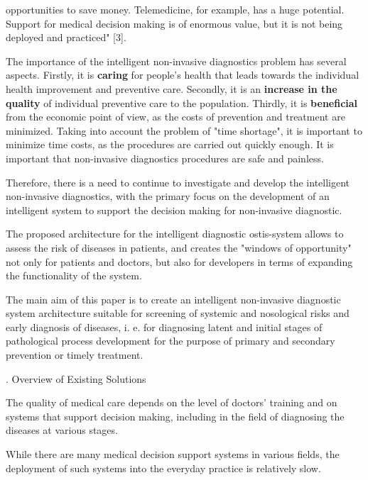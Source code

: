 \documentclass[a4paper]{article}
\newcommand{\RomanNumeralCaps}[1]
    {\MakeUppercase{\romannumeral #1}}
\begin{document}
\begin{multicols}{2}
opportunities to save money. Telemedicine, for example,
has a huge potential. Support for medical decision
making is of enormous value, but it is not being deployed
and practiced" [3].
\par The importance of the intelligent non-invasive diagnostics problem has several aspects. Firstly, it is \textbf{caring}
for people’s health that leads towards the individual
health improvement and preventive care. Secondly, it
is an \textbf{increase in the quality} of individual preventive
care to the population. Thirdly, it is \textbf{beneficial} from
the economic point of view, as the costs of prevention
and treatment are minimized. Taking into account the
problem of "time shortage", it is important to minimize
time costs, as the procedures are carried out quickly
enough. It is important that non-invasive diagnostics
procedures are safe and painless.
\par Therefore, there is a need to continue to investigate
and develop the intelligent non-invasive diagnostics, with
the primary focus on the development of an intelligent
system to support the decision making for non-invasive
diagnostic.
\par The proposed architecture for the intelligent diagnostic
ostis-system allows to assess the risk of diseases in
patients, and creates the "windows of opportunity" not
only for patients and doctors, but also for developers in
terms of expanding the functionality of the system.
\par The main aim of this paper is to create an intelligent
non-invasive diagnostic system architecture suitable for
screening of systemic and nosological risks and early
diagnosis of diseases, i. e. for diagnosing latent and
initial stages of pathological process development for the
purpose of primary and secondary prevention or timely
treatment.
\begin{center}
    \RomanNumeralCaps{2}. Overview of Existing Solutions
\end{center}
\par The quality of medical care depends on the level of
doctors’ training and on systems that support decision making, including in the field of diagnosing the diseases
at various stages.
\par While there are many medical decision support systems in various fields, the deployment of such systems
into the everyday practice is relatively slow.
\end{multicols}
\end{document}
